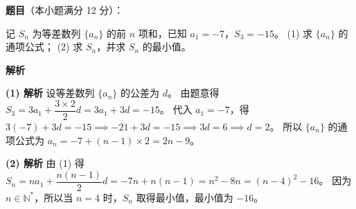 \begin{answer}

\textbf{题目}（本小题满分 12 分）：

记 $S_n$ 为等差数列 $\{a_n\}$ 的前 $n$ 项和，已知 $a_1=-7$，$S_3=-15$。
(1) 求 $\{a_n\}$ 的通项公式；
(2) 求 $S_n$，并求 $S_n$ 的最小值。

\textbf{解析}

\textbf{(1) 解析} 设等差数列 $\{a_n\}$ 的公差为 $d$。
由题意得 $S_3 = 3a_1 + \dfrac{3\times 2}{2}d = 3a_1+3d = -15$。
代入 $a_1=-7$，得 $3(-7)+3d = -15 \implies -21+3d = -15 \implies 3d = 6 \implies d=2$。
所以 $\{a_n\}$ 的通项公式为 $a_n = -7 + (n-1)\times 2 = 2n-9$。

\textbf{(2) 解析} 由 (1) 得 $S_n = na_1 + \dfrac{n(n-1)}{2}d = -7n + n(n-1) = n^2-8n = (n-4)^2-16$。
因为 $n\in\mathbb N^*$，所以当 $n=4$ 时，$S_n$ 取得最小值，最小值为 $-16$。



\end{answer}
